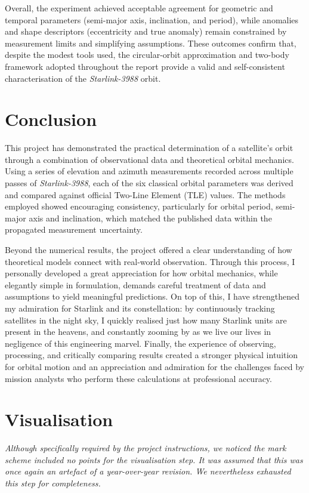 \documentclass{article}
\begin{document}
Overall, the experiment achieved acceptable agreement for geometric and temporal parameters (semi-major axis, inclination, and period), while anomalies and shape descriptors (eccentricity and true anomaly) remain constrained by measurement limits and simplifying assumptions. These outcomes confirm that, despite the modest tools used, the circular-orbit approximation and two-body framework adopted throughout the report provide a valid and self-consistent characterisation of the \textit{Starlink-3988} orbit.

\section{Conclusion}

This project has demonstrated the practical determination of a satellite’s orbit through a combination of observational data and theoretical orbital mechanics. Using a series of elevation and azimuth measurements recorded across multiple passes of \textit{Starlink-3988}, each of the six classical orbital parameters was derived and compared against official Two-Line Element (TLE) values. The methods employed showed encouraging consistency, particularly for orbital period, semi-major axis and inclination, which matched the published data within the propagated measurement uncertainty. 

Beyond the numerical results, the project offered a clear understanding of how theoretical models connect with real-world observation. Through this process, I personally developed a great appreciation for how orbital mechanics, while elegantly simple in formulation, demands careful treatment of data and assumptions to yield meaningful predictions. On top of this, I have strengthened my admiration for Starlink and its constellation: by continuously tracking satellites in the night sky, I quickly realised just how many Starlink units are present in the heavens, and constantly zooming by as we live our lives in negligence of this engineering marvel. Finally, the experience of observing, processing, and critically comparing results created a stronger physical intuition for orbital motion and an appreciation and admiration for the challenges faced by mission analysts who perform these calculations at professional accuracy.



\section{Visualisation}
\begin{center}
    \textit{Although specifically required by the project instructions, we noticed the mark scheme included no points for the visualisation step. It was assumed that this was once again an artefact of a year-over-year revision. We nevertheless exhausted this step for completeness.}
\end{center}
\end{document}
